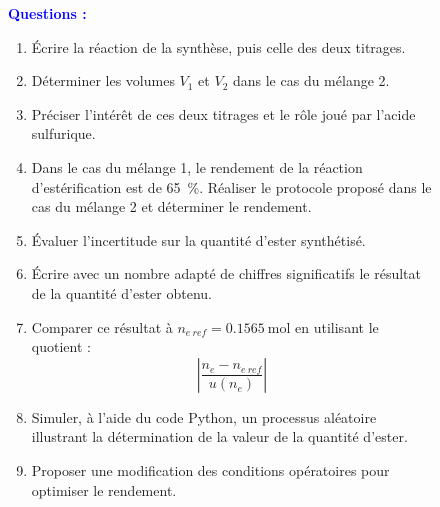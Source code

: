 \documentclass[a4paper,11pt,fleqn]{article}%
\begin{document}
\begin{figure}[h!]
\noindent \colorbox{blue!15}{\begin{minipage}{.98\linewidth}
	\begin{center}\textbf{\textcolor{Blue}{Questions :}}\end{center}
    \begin{enumerate}
        \item Écrire la réaction de la synthèse, puis celle des deux titrages.
        \item Déterminer les volumes $V_1$ et $V_2$ dans le cas du mélange 2. 
        \item Préciser l'intérêt de ces deux titrages et le rôle joué par l'acide sulfurique.
        \item Dans le cas du mélange 1, le rendement de la réaction d'estérification est de \SI{65}{\percent}. Réaliser le protocole proposé dans le cas du mélange 2 et déterminer le rendement.
        \item Évaluer l'incertitude sur la quantité d'ester synthétisé.
        \item Écrire avec un nombre adapté de chiffres significatifs le résultat de la quantité d'ester obtenu.
        \item Comparer ce résultat à $n_{e~ref}=\SI{0,1565}{\mole}$ en utilisant le quotient : $$\displaystyle\left\lvert\dfrac{n_e-n_{e~ref}}{u(n_e)}\right\vert$$
        \item Simuler, à l'aide du code Python, un processus aléatoire illustrant la détermination de la valeur de la quantité d'ester.
        \item Proposer une modification des conditions opératoires pour optimiser le rendement.
    \end{enumerate}
\end{minipage}}
\end{figure}
\end{document}
